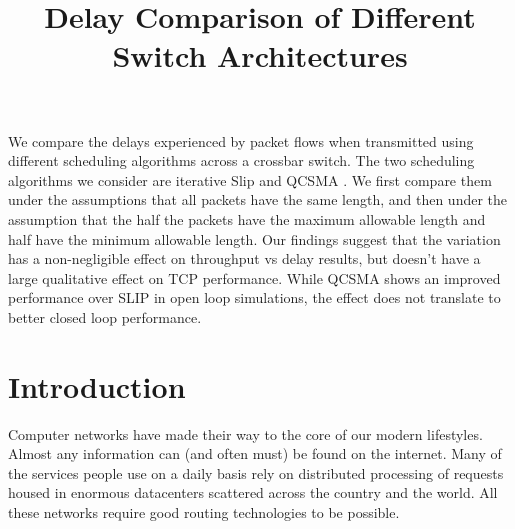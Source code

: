 \documentclass{IEEEtran}%
\begin{document}
\title{Delay Comparison of Different Switch Architectures}



\author{}






\maketitle

{\abstract
 We compare the delays experienced by packet flows when transmitted using different scheduling algorithms across a crossbar switch.  The two scheduling algorithms we consider are iterative Slip \cite{McKeown} and QCSMA \cite{Libin}.  We first compare them under the assumptions that all packets have the same length, and then under the assumption that the half the packets have the maximum allowable length and half have the minimum allowable length.  Our findings suggest that the variation has a non-negligible effect on throughput vs delay results, but doesn't have a large qualitative effect on TCP performance.  While QCSMA shows an improved performance over SLIP in open loop simulations, the effect does not translate to better closed loop performance.
}

\section{Introduction}
Computer networks have made their way to the core of our modern lifestyles.  Almost any information can (and often must) be found on the internet.  Many of the services people use on a daily basis rely on distributed processing of requests housed in enormous datacenters scattered across the country and the world.  All these networks require good routing technologies to be possible.
\end{document}
